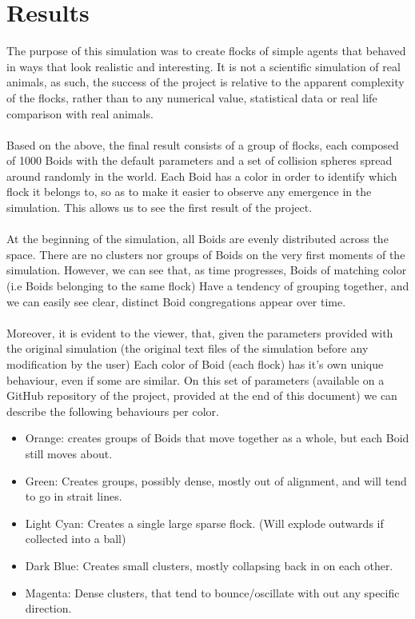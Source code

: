 \documentclass[12pt]{article}
\begin{document}
\section{Results}
The purpose of this simulation was to create flocks of simple agents that behaved in ways that look realistic and interesting. It is not a scientific simulation of real animals, as such, the success of the project is relative to the apparent complexity of the flocks, rather than to any numerical value, statistical data or real life comparison with real animals. 
\\ \\
Based on the above, the final result consists of a group of flocks, each composed of 1000 Boids with the default parameters and a set of collision spheres spread around randomly in the world.
Each Boid has a color in order to identify which flock it belongs to, so as to make it easier to observe any emergence in the simulation. This allows us to see the first result of the project. 
\\ \\
At the beginning of the simulation, all Boids are evenly distributed across the space. There are no clusters nor groups of Boids on the very first moments of the simulation. However, we can see that, as time progresses, Boids of matching color (i.e Boids belonging to the same flock) Have a tendency of grouping together, and we can easily see clear, distinct Boid congregations appear over time. 
\\ \\
Moreover, it is evident to the viewer, that, given the parameters provided with the original simulation (the original text files of the simulation before any modification by the user) Each color of Boid (each flock) has it's own unique behaviour, even if some are similar. On this set of parameters (available on a GitHub repository of the project, provided at the end of this document) we can describe the following behaviours per color.
\begin{itemize}
	\item Orange: creates groups of Boids that move together as a whole, but each Boid still moves about.
	
	\item Green: Creates groups, possibly dense, mostly out of alignment, and will tend to go in strait lines.
	
	\item Light Cyan: Creates a single large sparse flock. (Will explode outwards if collected into a ball)
	
	\item Dark Blue: Creates small clusters, mostly collapsing back in on each other.
	
	\item Magenta: Dense clusters, that tend to bounce/oscillate with out any specific direction.
\end{itemize}
\end{document}
